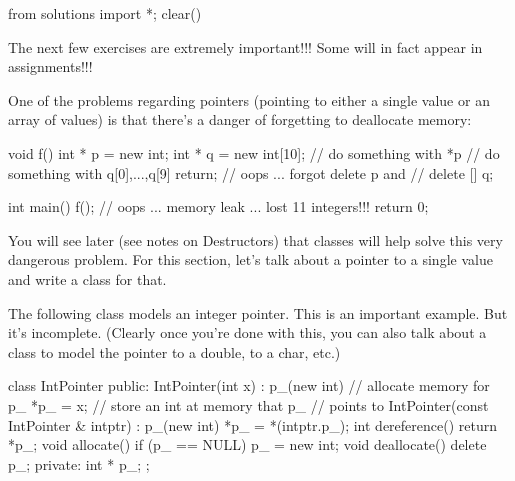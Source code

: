 \begin{python0}
from solutions import *; clear()
\end{python0}

The next few exercises are extremely important!!! Some will in fact
appear in assignments!!!

One of the problems regarding pointers (pointing to either a single
value or an array of values) is that there's a danger of forgetting to
deallocate memory:

\begin{consolethree}[escapeinside=||]
void f()
{
    int * p = new int;
    int * q = new int[10];
    // do something with *p
    // do something with q[0],...,q[9]
    return; // oops ... forgot delete p and
            // delete [] q;
}

int main()
{
    f();
    // oops ... memory leak ... lost 11 integers!!!
    return 0;
}
\end{consolethree}

You will see later (see notes on Destructors) that classes will help
solve this very dangerous problem. For this section,
let's talk about a pointer to a single value and write a
class for that.

The following class models an integer pointer. This is an important
example. But it's incomplete. (Clearly once
you're done with this, you can also talk about a class
to model the pointer to a double, to a char, etc.)

\begin{consolethree}[escapeinside=||]
class IntPointer
{
public:
    IntPointer(int x)
        : p_(new int) // allocate memory for p_
    {
        *p_ = x;      // store an int at memory that p_
                      // points to
    }
    IntPointer(const IntPointer & intptr)
        : p_(new int)
    {
        *p_ = *(intptr.p_);
    }
    int dereference()
    {
        return *p_;
    }
    void allocate()
    {
        if (p_ == NULL)
        {
            p_ = new int;
        }
    }
    void deallocate()
    {
        delete p_;
    }
private:
    int * p_;
};
\end{consolethree}








